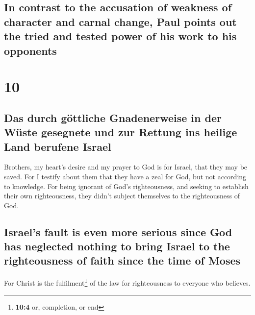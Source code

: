 \hypertarget{in-contrast-to-the-accusation-of-weakness-of-character-and-carnal-change-paul-points-out-the-tried-and-tested-power-of-his-work-to-his-opponents}{%
\subsection{In contrast to the accusation of weakness of character and
carnal change, Paul points out the tried and tested power of his work to
his
opponents}\label{in-contrast-to-the-accusation-of-weakness-of-character-and-carnal-change-paul-points-out-the-tried-and-tested-power-of-his-work-to-his-opponents}}

\hypertarget{section-9}{%
\section{10}\label{section-9}}

\hypertarget{das-durch-guxf6ttliche-gnadenerweise-in-der-wuxfcste-gesegnete-und-zur-rettung-ins-heilige-land-berufene-israel}{%
\subsection{Das durch göttliche Gnadenerweise in der Wüste gesegnete und
zur Rettung ins heilige Land berufene
Israel}\label{das-durch-guxf6ttliche-gnadenerweise-in-der-wuxfcste-gesegnete-und-zur-rettung-ins-heilige-land-berufene-israel}}

 Brothers, my heart's desire and my prayer to God is for
Israel, that they may be saved.  For I testify about them
that they have a zeal for God, but not according to knowledge.
 For being ignorant of God's righteousness, and seeking to
establish their own righteousness, they didn't subject themselves to the
righteousness of God.

\hypertarget{israels-fault-is-even-more-serious-since-god-has-neglected-nothing-to-bring-israel-to-the-righteousness-of-faith-since-the-time-of-moses}{%
\subsection{Israel's fault is even more serious since God has neglected
nothing to bring Israel to the righteousness of faith since the time of
Moses}\label{israels-fault-is-even-more-serious-since-god-has-neglected-nothing-to-bring-israel-to-the-righteousness-of-faith-since-the-time-of-moses}}

 For Christ is the fulfilment\footnote{\textbf{10:4} or,
  completion, or end} of the law for righteousness to everyone who
believes.

